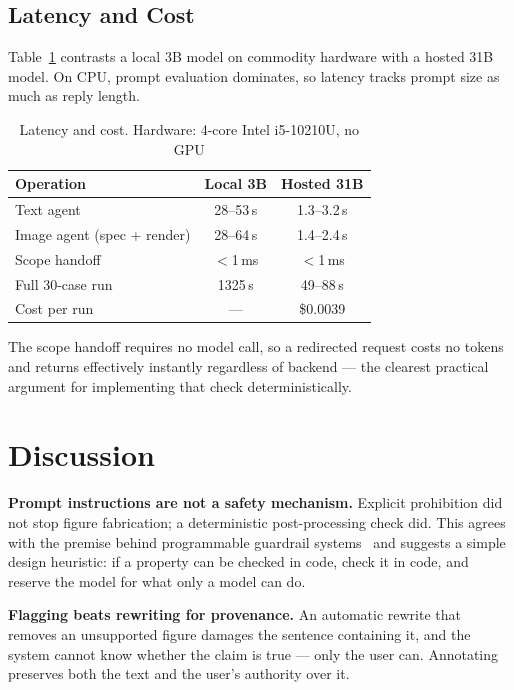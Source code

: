 \documentclass[journal]{IEEEtran}
\begin{document}
\subsection{Latency and Cost}
Table~\ref{tab:perf} contrasts a local 3B model on commodity hardware with a
hosted 31B model. On CPU, prompt evaluation dominates, so latency tracks prompt
size as much as reply length.

\begin{table}[!t]
\caption{Latency and cost. Hardware: 4-core Intel i5-10210U, no GPU}
\label{tab:perf}
\centering
\footnotesize
\begin{tabular}{@{}lcc@{}}
\toprule
Operation & Local 3B & Hosted 31B\\
\midrule
Text agent                & 28--53\,s & 1.3--3.2\,s\\
Image agent (spec + render)& 28--64\,s & 1.4--2.4\,s\\
Scope handoff             & $<$1\,ms & $<$1\,ms\\
Full 30-case run          & 1325\,s & 49--88\,s\\
Cost per run              & --- & \$0.0039\\
\bottomrule
\end{tabular}
\end{table}

The scope handoff requires no model call, so a redirected request costs no
tokens and returns effectively instantly regardless of backend --- the clearest
practical argument for implementing that check deterministically.

\section{Discussion}
\label{sec:discussion}

\textbf{Prompt instructions are not a safety mechanism.} Explicit prohibition
did not stop figure fabrication; a deterministic post-processing check did. This
agrees with the premise behind programmable guardrail
systems~\cite{rebedea2023nemo} and suggests a simple design heuristic: if a
property can be checked in code, check it in code, and reserve the model for
what only a model can do.

\textbf{Flagging beats rewriting for provenance.} An automatic rewrite that
removes an unsupported figure damages the sentence containing it, and the system
cannot know whether the claim is true --- only the user can. Annotating
preserves both the text and the user's authority over it.
\end{document}
